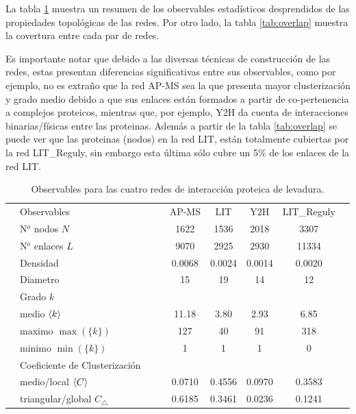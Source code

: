 La tabla \ref{tab:obs} muestra un resumen de los observables estad\'isticos desprendidos de las propiedades topol\'ogicas de las redes. Por otro lado, la tabla \ref{tab:overlap} muestra la covertura entre cada par de redes. 

Es importante notar que debido a las diversas t\'ecnicas de construcci\'on de las redes, estas presentan diferencias significativas entre sus observables, como por ejemplo, no es extraño que la red AP-MS sea la que presenta mayor clusterizaci\'on y grado medio debido a que sus enlaces est\'an formados a partir de co-pertenencia a complejos proteicos, mientras que, por ejemplo, Y2H da cuenta de interacciones binarias/f\'isicas entre las proteinas. Adem\'as a partir de la tabla \ref{tab:overlap} se puede ver que las proteinas (nodos) en la red LIT, est\'an totalmente cubiertas por la red LIT\_Reguly, sin embargo esta \'ultima s\'olo cubre un 5\% de los enlaces de la red LIT.



\begin{table}[!ht]
    \centering
    \caption{\label{tab:obs}Observables para las cuatro redes de interacci\'on proteica de levadura.}
    {\scriptsize
    \begin{tabularx}{1\columnwidth}{XlX|XccccX}
        \hline\hline
        &\multirow{2}{*}{Observables}        &&& \multirow{2}{*}{AP-MS} & \multirow{2}{*}{LIT} & \multirow{2}{*}{Y2H} & \multirow{2}{*}{LIT\_Reguly} &\\ 
        &&&&&&\\
        \hline
        &N$^o$ nodos $N$    &&& 1622 & 1536 & 2018 &  3307 &\\
        &N$^o$ enlaces $L$  &&& 9070 & 2925 & 2930 & 11334 &\\
        &Densidad           &&& 0.0068 & 0.0024 & 0.0014 & 0.0020&\\
        &Diametro           &&& 15 & 19 & 14 & 12\\
        \hline
        &Grado $k$&&&\\
        &\quad medio  $\left\langle k\right\rangle$     &&& 11.18 & 3.80& 2.93 & 6.85 &\\
        &\quad maximo $\max(\{k\})$  &&& 127  & 40   & 91 & 318&\\ 
        &\quad minimo $\min(\{k\})$  &&& 1    & 1    & 1 & 0&\\ 
        \hline
        &Coeficiente de Clusterizaci\'on&&&\\
        \hline
        &\quad medio/local $\left\langle C\right\rangle$               &&& 0.0710 & 0.4556 & 0.0970 & 0.3583&\\
        &\quad triangular/global $C_\bigtriangleup$ &&& 0.6185 & 0.3461 & 0.0236 & 0.1241&\\
        \hline\hline
    \end{tabularx}
    }
\end{table}

